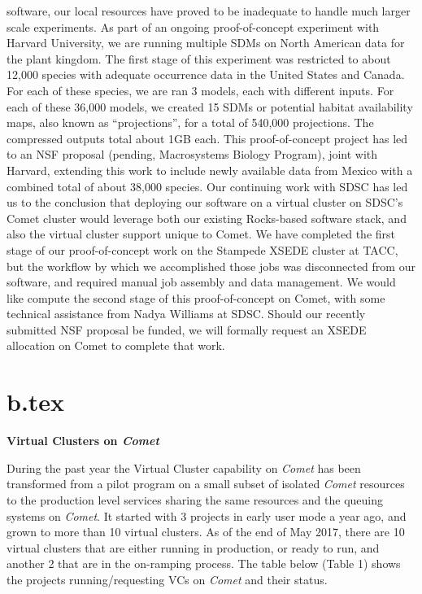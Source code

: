 software, our local resources have proved to be inadequate to handle
much larger scale experiments. As part of an ongoing proof-of-concept
experiment with Harvard University, we are running multiple SDMs on
North American data for the plant kingdom. The first stage of this
experiment was restricted to about 12,000 species with adequate
occurrence data in the United States and Canada. For each of these
species, we are ran 3 models, each with different inputs. For each of
these 36,000 models, we created 15 SDMs or potential habitat
availability maps, also known as ``projections'', for a total of 540,000
projections. The compressed outputs total about 1GB each. This
proof-of-concept project has led to an NSF proposal (pending,
Macrosystems Biology Program), joint with Harvard, extending this work
to include newly available data from Mexico with a combined total of
about 38,000 species. Our continuing work with SDSC has led us to the
conclusion that deploying our software on a virtual cluster on SDSC's
Comet cluster would leverage both our existing Rocks-based software
stack, and also the virtual cluster support unique to Comet. We have
completed the first stage of our proof-of-concept work on the Stampede
XSEDE cluster at TACC, but the workflow by which we accomplished those
jobs was disconnected from our software, and required manual job
assembly and data management. We would like compute the second stage of
this proof-of-concept on Comet, with some technical assistance from
Nadya Williams at SDSC. Should our recently submitted NSF proposal be
funded, we will formally request an XSEDE allocation on Comet to
complete that work.

\section{b.tex}

\textbf{Virtual Clusters on \emph{Comet}}

During the past year the Virtual Cluster capability on \emph{Comet} has
been transformed from a pilot program on a small subset of isolated
\emph{Comet} resources to the production level services sharing the same
resources and the queuing systems on \emph{Comet}. It started with 3
projects in early user mode a year ago, and grown to more than 10
virtual clusters. As of the end of May 2017, there are 10 virtual
clusters that are either running in production, or ready to run, and
another 2 that are in the on-ramping process. The table below (Table 1)
shows the projects running/requesting VCs on \emph{Comet} and their
status.

